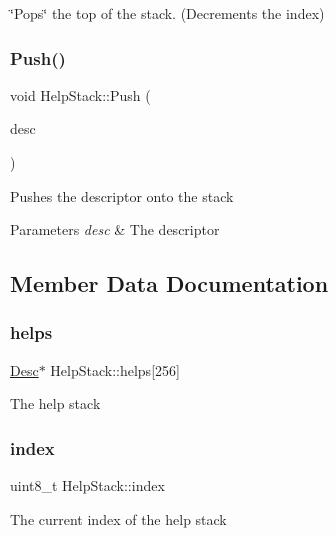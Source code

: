 \char`\"{}\+Pops\char`\"{} the top of the stack. (Decrements the index) \mbox{\label{structHelpStack_a184dc0935dc30b94113a938d4ab7fe28}} 
\subsubsection{\texorpdfstring{Push()}{Push()}}
{\footnotesize\ttfamily void Help\+Stack\+::\+Push (\begin{DoxyParamCaption}\item[{\hyperlink{structDesc}{Desc} $\ast$}]{desc }\end{DoxyParamCaption})\hspace{0.3cm}{\ttfamily [inline]}}

Pushes the descriptor onto the stack


\begin{DoxyParams}{Parameters}
{\em desc} & The descriptor \\
\hline
\end{DoxyParams}


\subsection{Member Data Documentation}
\mbox{\label{structHelpStack_a3b2078f79f39ba359f323d75968cbed0}} 
\subsubsection{\texorpdfstring{helps}{helps}}
{\footnotesize\ttfamily \hyperlink{structDesc}{Desc}$\ast$ Help\+Stack\+::helps\mbox{[}256\mbox{]}}

The help stack \mbox{\label{structHelpStack_a0e5d134dcafa9ab20ea25b11b9bc0175}} 
\subsubsection{\texorpdfstring{index}{index}}
{\footnotesize\ttfamily uint8\+\_\+t Help\+Stack\+::index}

The current index of the help stack \mbox{\label{structHelpStack_a334edfc6ddcf054de46a50c34174d593}} 
